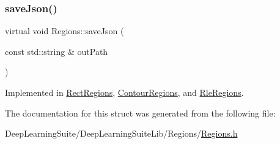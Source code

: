 \mbox{\label{struct_regions_a402078d4ff67e4aee31b231c2d1942c6}} 
\subsubsection{\texorpdfstring{save\+Json()}{saveJson()}}
{\footnotesize\ttfamily virtual void Regions\+::save\+Json (\begin{DoxyParamCaption}\item[{const std\+::string \&}]{out\+Path }\end{DoxyParamCaption})\hspace{0.3cm}{\ttfamily [pure virtual]}}



Implemented in \hyperlink{struct_rect_regions_a84d6d3a2e3ee8faf775c69fcd3207767}{Rect\+Regions}, \hyperlink{struct_contour_regions_a78fc9a246628abb76f5765c4102847e4}{Contour\+Regions}, and \hyperlink{struct_rle_regions_a643c55d59720ba45a78e0e6090018e05}{Rle\+Regions}.



The documentation for this struct was generated from the following file\+:\begin{DoxyCompactItemize}
\item 
Deep\+Learning\+Suite/\+Deep\+Learning\+Suite\+Lib/\+Regions/\hyperlink{_regions_8h}{Regions.\+h}\end{DoxyCompactItemize}
